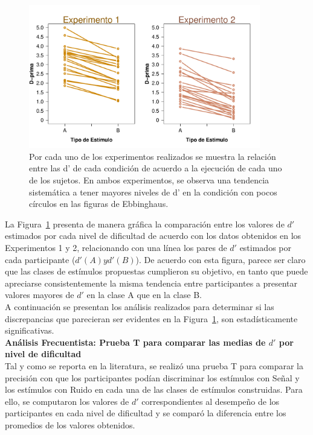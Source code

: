 \begin{figure}[th]
\centering
\includegraphics[width=0.90\textwidth]{Figures/Diff_D_E1yE2}
\caption[Diferencias entre las $d'$ de los niveles de dificultad propuestos]{Por cada uno de los experimentos realizados se muestra la relación entre las d' de cada condición de acuerdo a la ejecución de cada uno de los sujetos. En ambos experimentos, se observa una tendencia sistemática a tener mayores niveles de d' en la condición con pocos círculos en las figuras de Ebbinghaus.}
\label{fig:Diff_D}
\end{figure}

La Figura~\ref{fig:Diff_D} presenta de manera gráfica la comparación entre los valores de $d'$ estimados por cada nivel de dificultad de acuerdo con los datos obtenidos en los Experimentos 1 y 2, relacionando con una línea los pares de $d'$ estimados por cada participante ($d'(A) y d'(B)$). De acuerdo con esta figura, parece ser claro que las clases de estímulos propuestas cumplieron su objetivo, en tanto que puede apreciarse consistentemente la misma tendencia entre participantes a presentar valores mayores de $d'$ en la clase A que en la clase B.\\

A continuación se presentan los análisis realizados para determinar si las discrepancias que parecieran ser evidentes en la Figura~\ref{fig:Diff_D}, son estadísticamente significativas.\\

\textbf{Análisis Frecuentista: Prueba T para comparar las medias de $d'$ por nivel de dificultad}\\

Tal y como se reporta en la literatura, se realizó una prueba T para comparar la precisión con que los participantes podían discriminar los estímulos con Señal y los estímulos con Ruido en cada una de las clases de estímulos construidas. Para ello, se computaron los valores de $d'$ correspondientes al desempeño de los participantes en cada nivel de dificultad y se comparó la diferencia entre los promedios de los valores obtenidos.\\

